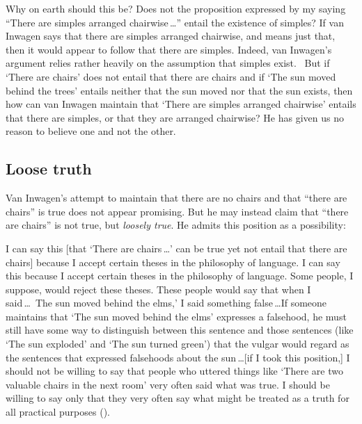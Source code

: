 \documentclass[11pt]{standalone}
\newenvironment{squote}{%
\begin{spacing}{1}
       	\begin{list}{}{%
\setlength{\labelwidth}{0pt}%
\rightmargin\leftmargin%
}
\item\relax
}{%
\end{list}%
\end{spacing}
}
\begin{document}
\begin{spacing}{1.5}
Why on earth should this be?  Does not the proposition expressed by my
saying ``There are simples arranged chairwise\,\ldots '' entail the
existence of simples?  If van Inwagen says that there are simples
arranged chairwise, and means just that, then it would appear to
follow that there are simples.  Indeed, van Inwagen's argument relies
rather heavily on the assumption that simples exist.
%
%
\ But if `There are chairs' does not entail that there are chairs and
if `The sun moved behind the trees' entails neither that the sun moved
nor that the sun exists, then how can van Inwagen maintain that `There
are simples arranged chairwise' entails that there are simples, or
that they are arranged chairwise?  He has given us no reason to
believe one and not the other.

\subsection{Loose truth}
\label{loose-v}
Van Inwagen's attempt to maintain that there are no chairs and that
``there are chairs'' is true does not appear promising.  But he may
instead claim that ``there are chairs'' is not true, but {\em loosely
  true}.  He admits this position as a possibility:

\begin{squote}
I can say this [that `There are chairs\,\ldots ' can be true yet not
  entail that there are chairs] because I accept certain theses in the
philosophy of language.  I can say this because I accept certain
theses in the philosophy of language.  Some people, I suppose, would
reject these theses.  These people would say that when I
said\,\ldots\ The sun moved behind the elms,' I said something
false\,\ldots If someone maintains that `The sun moved behind the
elms' expresses a falsehood, he must still have some way to
distinguish between this sentence and those sentences (like `The sun
exploded' and `The sun turned green') that the vulgar would regard as
the sentences that expressed falsehoods about the sun\,\ldots [if I
  took this position,] I should not be willing to say that people who
uttered things like `There are two valuable chairs in the next room'
very often said what was true.  I should be willing to say only that
they very often say what might be treated as a truth for all practical
purposes (\citeyear[102--103]{inwagen1995}).
\end{squote}


\end{spacing}
\end{document}
